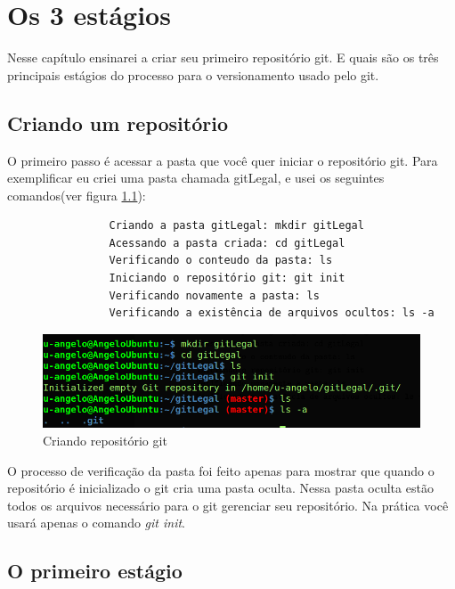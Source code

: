\documentclass[12pt,openright,oneside,a4paper,english,brazil]{abntex2}
\begin{document}
\chapter{Os 3 estágios}

Nesse capítulo ensinarei a criar seu primeiro repositório git. E quais são os três principais estágios do processo para o versionamento usado pelo git.

\section{Criando um repositório}

O primeiro passo é acessar a pasta que você quer iniciar o repositório git. Para exemplificar eu criei uma pasta chamada gitLegal, e usei os seguintes comandos(ver figura \ref{repositorio}):

\begin{verbatim}
		        Criando a pasta gitLegal: mkdir gitLegal
		        Acessando a pasta criada: cd gitLegal
		        Verificando o conteudo da pasta: ls
		        Iniciando o repositório git: git init
		        Verificando novamente a pasta: ls
		        Verificando a existência de arquivos ocultos: ls -a
\end{verbatim}

\begin{figure}[h]
	\caption{\label{repositorio}Criando repositório git}
	\begin{center}
		\includegraphics[width=1\linewidth]{repositorio}
	\end{center}
\end{figure}

O processo de verificação da pasta foi feito apenas para mostrar que quando o repositório é inicializado o git cria uma pasta oculta. Nessa pasta oculta estão todos os arquivos necessário para o git gerenciar seu repositório. Na prática você usará apenas o comando \textit{git init}.

\section{O primeiro estágio}
\end{document}
